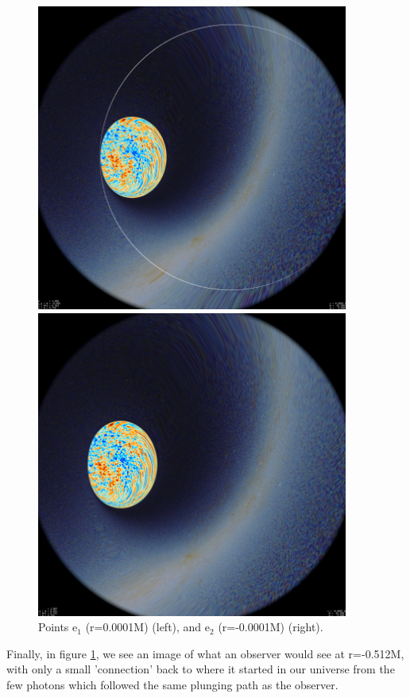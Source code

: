 \documentclass[oneside,openright,frontopenright, singlespacing]{dmathesis}
\begin{document}
\vspace{1em}
\begin{figure}[!ht]
	\centering
	\begin{minipage}{0.5\textwidth}
		\centering
		\includegraphics[width=0.75\linewidth]{img/plunging5-1}
	\end{minipage}%
	\hfill
	\begin{minipage}{0.5\textwidth}
		\centering
		\includegraphics[width=0.75\linewidth]{img/plunging5-2}
	\end{minipage}
	\caption{Points e$_1$ (r=0.0001M) (left), and e$_2$ (r=-0.0001M) (right).}
	\label{fig:Figure6.6}
\end{figure}

\vspace{1em}
	Finally, in figure \ref{fig:Figure6.6}, we see an image of what an observer would see at r=-0.512M, with only a small 'connection' back to where it started in our universe from the few photons which followed the same plunging path as the observer.
\end{document}
